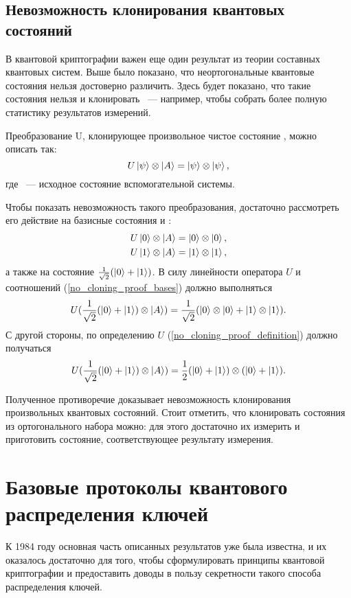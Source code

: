 \subsection{Невозможность клонирования квантовых состояний}\label{no_cloning_theorem}
В квантовой криптографии важен еще один результат из теории составных квантовых систем. Выше было показано, что неортогональные квантовые состояния нельзя достоверно различить. Здесь будет показано, что такие состояния нельзя и клонировать \cite{no_cloning_theorem}~--- например, чтобы собрать более полную статистику результатов измерений.

Преобразование U, клонирующее произвольное чистое состояние \state{\psi}, можно описать так:
\begin{equation}\label{no_cloning_proof_definition}
  U\left| \psi \right\rangle\otimes\left| A \right\rangle = \left| \psi \right\rangle\otimes\left| \psi \right\rangle,  
\end{equation}
где ~--- исходное состояние вспомогательной системы.

Чтобы показать невозможность такого преобразования, достаточно рассмотреть его действие на базисные состояния  и :
\begin{eqnarray}\label{no_cloning_proof_bases}
  U\left| 0 \right\rangle\otimes\left| A \right\rangle = \left| 0 \right\rangle\otimes\left| 0 \right\rangle, \nonumber\\
  U\left| 1 \right\rangle\otimes\left| A \right\rangle = \left| 1 \right\rangle\otimes\left| 1 \right\rangle,
\end{eqnarray}
а также на состояние $\frac{1}{\sqrt{2}}(\left| 0 \right\rangle + \left| 1 \right\rangle)$. В силу линейности оператора $U$ и соотношений (\ref{no_cloning_proof_bases}) должно выполняться
\begin{equation}U(\frac{1}{\sqrt{2}}(\left| 0 \right\rangle + \left| 1 \right\rangle) \otimes \left| A \right\rangle) = \frac{1}{\sqrt{2}}(\left| 0 \right\rangle \otimes \left| 0 \right\rangle + \left| 1 \right\rangle \otimes \left| 1 \right\rangle).\end{equation}
С другой стороны, по определению $U$ (\ref{no_cloning_proof_definition}) должно получаться
\begin{equation}U(\frac{1}{\sqrt{2}}(\left| 0 \right\rangle + \left| 1 \right\rangle) \otimes \left| A \right\rangle) = \frac{1}{2}(\left| 0 \right\rangle + \left| 1 \right\rangle) \otimes (\left| 0 \right\rangle + \left| 1 \right\rangle).\end{equation}

Полученное противоречие доказывает невозможность клонирования произвольных квантовых состояний. Стоит отметить, что клонировать состояния из ортогонального набора можно: для этого достаточно их измерить и приготовить состояние, соответствующее результату измерения.

\section{Базовые протоколы квантового распределения ключей}
К 1984 году основная часть описанных результатов уже была известна, и их оказалось достаточно для того, чтобы сформулировать принципы квантовой криптографии и предоставить доводы в пользу секретности такого способа распределения ключей. 

